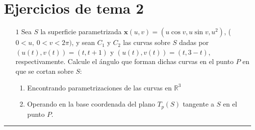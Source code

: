 
\chapter*{Ejercicios de tema 2}
\large

\begin{enumerate}
    \item[$\boxed{1}$] Sea $S$ la superficie parametrizada $\mathbf{x}(u,v)=(u\cos v,u\sin v,u^2)$, ($0<u,\ 0<v<2\pi )$, y sean $C_1$ y $C_2$ las curvas sobre $S$ dadas por $(u(t),v(t))=(t,t+1)$ y $(u(t),v(t))=(t,3-t)$, respectivamente. Calcule el ángulo que forman dichas curvas en el punto $P$ en que se cortan sobre $S$:
    \begin{enumerate}
        \item Encontrando parametrizaciones de las curvas en $\mathbb{R}^3$
        \item Operando en la base coordenada del plano $T_p(S)$ tangente a $S$ en el punto $P$.
    \end{enumerate}
\end{enumerate}
\noindent\rule{\textwidth}{0.5pt}

